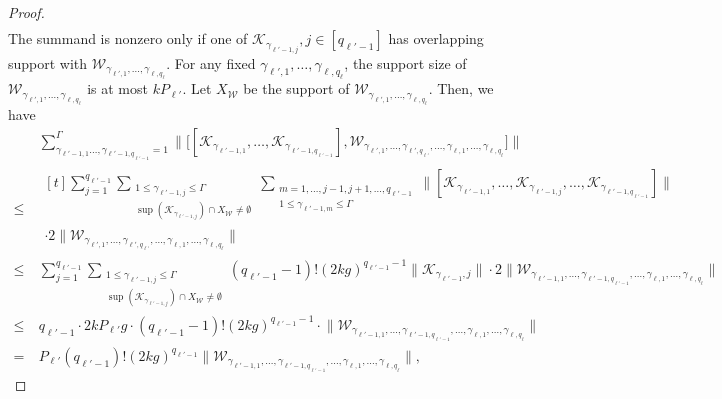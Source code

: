 \documentclass[11pt]{article}
\newcommand{\mc}{\mathcal}
\begin{document}
\begin{proof}
\begin{align*}
    \end{align*}
    The summand is nonzero only if one of $\mc K_{\gamma_{\ell'-1,  
    j}}, j\in [q_{\ell'-1}]$ has overlapping support with $\mc W_{\gamma_{\ell',1}, \ldots,\gamma_{\ell,q_\ell}}$. For any fixed $\gamma_{\ell',1}, \ldots, \gamma_{\ell,q_\ell}$, the support size of $\mc W_{\gamma_{\ell',1}, \ldots, \gamma_{\ell,q_\ell}}$ is at most $kP_{\ell'}$. Let $X_{\mc W}$ be the support of $\mc W_{\gamma_{\ell',1}, \ldots,\gamma_{\ell,q_\ell}}$. Then, we have \begin{align*}
        &\sum_{\gamma_{\ell'-1,1}\ldots, \gamma_{\ell'-1,q_{\ell'-1}}=1}^{\Gamma}\bigg\|\Big[[\mathcal{K}_{\gamma_{\ell'-1,1}}, \ldots, \mathcal{K}_{\gamma_{\ell'-1, q_{\ell'-1}}}], \mc W_{\gamma_{\ell',1}, \ldots, \gamma_{\ell', q_{\ell'}}, \ldots, \gamma_{\ell, 1}, \ldots, \gamma_{\ell,q_\ell}}\Big]\bigg\|\\
        \le~&
        \begin{multlined}[t]
            \sum_{j=1}^{q_{\ell'-1}}
            \sum_{\substack{1\le\gamma_{\ell'-1,j}\le \Gamma\\\sup(\mc K_{\gamma_{\ell'-1,j}})\cap X_{\mc W}\neq \emptyset}}
            \sum_{\substack{m=1, \ldots, j-1, j+1, \ldots, q_{\ell'-1}\\1\le\gamma_{\ell'-1,m}\le \Gamma}}
            \big\|[\mathcal{K}_{\gamma_{\ell'-1,1}}, \ldots, \mc K_{\gamma_{\ell'-1,j}}, \ldots, \mathcal{K}_{\gamma_{\ell'-1, q_{\ell'-1}}}]\big\| \\ \cdot2\big\|\mc W_{\gamma_{\ell',1}, \ldots, \gamma_{\ell', q_{\ell'}}, \ldots, \gamma_{\ell, 1}, \ldots, \gamma_{\ell,q_\ell}}\big\|
        \end{multlined} \\
        \le~&\sum_{j=1}^{q_{\ell'-1}}
        \sum_{\substack{1\le\gamma_{\ell'-1,j}\le \Gamma\\\sup(\mc K_{\gamma_{\ell'-1,j}})\cap X_{\mc W}\neq \emptyset}}(q_{\ell'-1}-1)!(2kg)^{q_{\ell'-1}-1}\big\|\mc K_{\gamma_{\ell'-1}, j}\big\|\cdot2\big\|\mc W_{\gamma_{\ell'-1,1}, \ldots, \gamma_{\ell'-1, q_{\ell'-1}}, \ldots, \gamma_{\ell, 1}, \ldots, \gamma_{\ell,q_\ell}}\big\|\\
        \le~& q_{\ell'-1}\cdot 2kP_{\ell'}g\cdot (q_{\ell'-1}-1)!(2kg)^{q_{\ell'-1}-1}\cdot\big\|\mc W_{\gamma_{\ell'-1,1}, \ldots, \gamma_{\ell'-1, q_{\ell'-1}}, \ldots, \gamma_{\ell, 1}, \ldots, \gamma_{\ell,q_\ell}}\big\|\\
        =~& P_{\ell'}(q_{\ell'-1})!(2kg)^{q_{\ell'-1}}\big\|\mc W_{\gamma_{\ell'-1,1}, \ldots, \gamma_{\ell'-1, q_{\ell'-1}}, \ldots, \gamma_{\ell, 1}, \ldots, \gamma_{\ell,q_\ell}}\big\|,

\end{align*}
\end{proof}
\end{document}
